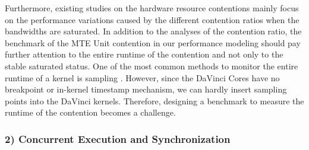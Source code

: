 Furthermore, existing studies on the hardware resource contentions \cite{DBLP:conf/sc/HristeaLK97, DBLP:conf/usenix/SrikanthanDS15} mainly focus on the performance variations caused by the different contention ratios when the bandwidths are saturated. In addition to the analyses of the contention ratio, the benchmark of the MTE Unit contention in our performance modeling should pay further attention to the entire runtime of the contention and not only to the stable saturated status. One of the most common methods to monitor the entire runtime of a kernel is sampling \cite{IBM_profiler, Del_profiler, Goo_profiler}. However, since the DaVinci Cores have no breakpoint or in-kernel timestamp mechanism, we can hardly insert sampling points into the DaVinci kernels. Therefore, designing a benchmark to measure the runtime of the contention becomes a challenge.

\subsubsection{2) Concurrent Execution and Synchronization}

